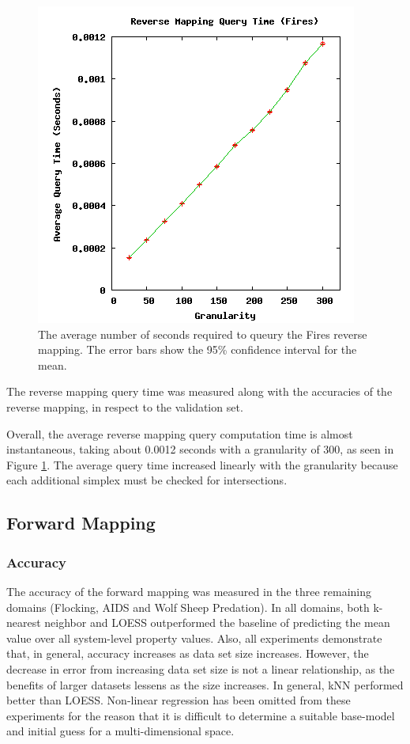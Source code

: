 \begin{figure}[ht]
\centering
\includegraphics[scale=.5]{images/results_fires/rmquery.png}
\caption{The average number of seconds required to queury the Fires reverse mapping.
The error bars show the 95\% confidence interval for the mean.}
\label{fig:rmquery}
\end{figure}

The reverse mapping query time was measured along with the accuracies of the reverse mapping, in respect to the validation set.

Overall, the average reverse mapping query computation time is almost instantaneous, taking about 0.0012 seconds with a granularity of 300, as seen in Figure \ref{fig:rmquery}.
The average query time increased linearly with the granularity because each additional simplex must be checked for intersections.


 \subsection{Forward Mapping}

  \subsubsection{Accuracy}

The accuracy of the forward mapping was measured in the three remaining domains (Flocking, AIDS and Wolf Sheep Predation).
In all domains, both k-nearest neighbor and LOESS outperformed the baseline of predicting the mean value over all system-level property values.
Also, all experiments demonstrate that, in general, accuracy increases as data set size increases.
However, the decrease in error from increasing data set size is not a linear relationship, as the benefits of larger datasets lessens as the size increases.
In general, kNN performed better than LOESS.
Non-linear regression has been omitted from these experiments for the reason that it is difficult to determine a suitable base-model and initial guess for a multi-dimensional space.

